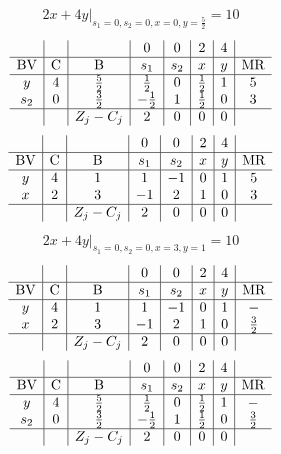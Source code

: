 \documentclass{article}
\begin{document}
\begin{align*}
\left.2x + 4y\right|_{s_{1}=0,s_{2}=0,x=0,y=\frac{5}{2}}=10\end{align*}
\begin{align*}
\begin{array}{c|c|c|c|c|c|c|c}
 &  &  & 0 & 0 & 2 & 4 & \\
\hline
\text{BV} & \text{C} & \text{B} & s_{1} & s_{2} & x & y & \text{MR} \\
\hline
y & 4 & \frac{5}{2} & \frac{1}{2} & 0 & \frac{1}{2} & 1 & 5 \\
s_{2} & 0 & \frac{3}{2} & -\frac{1}{2} & 1 & \frac{1}{2} & 0 & 3 \\
\hline
 &  & Z_j-C_j & 2 & 0 & 0 & 0 & \\
\end{array}
\end{align*}
\begin{align*}
\begin{array}{c|c|c|c|c|c|c|c}
 &  &  & 0 & 0 & 2 & 4 & \\
\hline
\text{BV} & \text{C} & \text{B} & s_{1} & s_{2} & x & y & \text{MR} \\
\hline
y & 4 & 1 & 1 & -1 & 0 & 1 & 5 \\
x & 2 & 3 & -1 & 2 & 1 & 0 & 3 \\
\hline
 &  & Z_j-C_j & 2 & 0 & 0 & 0 & \\
\end{array}
\end{align*}
\begin{align*}
\left.2x + 4y\right|_{s_{1}=0,s_{2}=0,x=3,y=1}=10\end{align*}
\begin{align*}
\begin{array}{c|c|c|c|c|c|c|c}
 &  &  & 0 & 0 & 2 & 4 & \\
\hline
\text{BV} & \text{C} & \text{B} & s_{1} & s_{2} & x & y & \text{MR} \\
\hline
y & 4 & 1 & 1 & -1 & 0 & 1 & - \\
x & 2 & 3 & -1 & 2 & 1 & 0 & \frac{3}{2} \\
\hline
 &  & Z_j-C_j & 2 & 0 & 0 & 0 & \\
\end{array}
\end{align*}
\begin{align*}
\begin{array}{c|c|c|c|c|c|c|c}
 &  &  & 0 & 0 & 2 & 4 & \\
\hline
\text{BV} & \text{C} & \text{B} & s_{1} & s_{2} & x & y & \text{MR} \\
\hline
y & 4 & \frac{5}{2} & \frac{1}{2} & 0 & \frac{1}{2} & 1 & - \\
s_{2} & 0 & \frac{3}{2} & -\frac{1}{2} & 1 & \frac{1}{2} & 0 & \frac{3}{2} \\
\hline
 &  & Z_j-C_j & 2 & 0 & 0 & 0 & \\
\end{array}
\end{align*}
\end{document}
